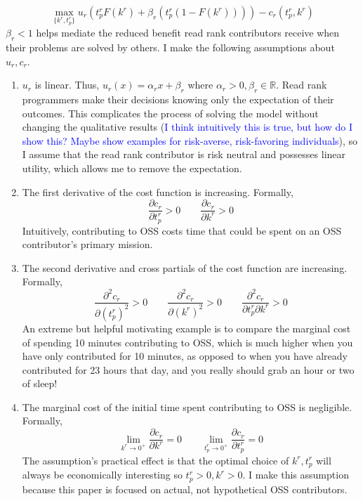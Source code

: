 \documentclass[12pt,notitlepage]{article}
\begin{document}
$$\max_{\{k^r, t_p^r\}} u_r\left(t_p^rF(k^r) + \beta_r(t_p^r (1-F(k^r))) \right) - c_r(t_p^r, k^r)$$
$\beta_r < 1$ helps mediate the reduced benefit read rank contributors receive when their problems are solved by others. 
I make the following assumptions about $u_r, c_r$. 
\begin{enumerate}
    \item $u_r$ is linear. Thus, $u_r(x) = \alpha_r x + \beta_r$ where $\alpha_r > 0, \beta_r \in \mathbb{R}$. Read rank programmers make their decisions knowing only the expectation of their outcomes. This complicates the process of solving the model without changing the qualitative results (\textcolor{blue}{I think intuitively this is true, but how do I show this? Maybe show examples for risk-averse, risk-favoring individuals}), so I assume that the read rank contributor is risk neutral and possesses linear utility, which allows me to remove the expectation. 
    \item The first derivative of the cost function is increasing. Formally, 
    $$\frac{\partial c_r}{\partial t_p^r}>0 \qquad \frac{\partial c_r}{\partial k^r}>0$$
    Intuitively, contributing to OSS costs time that could be spent on an OSS contributor's primary mission. 
    \item The second derivative and cross partials of the cost function are increasing. Formally, $$\frac{\partial^2 c_r}{\partial (t_p^r)^2}>0 \qquad \frac{\partial^2 c_r}{\partial (k^r)^2}>0 \qquad \frac{\partial^2 c_r}{\partial t_p^r \partial k^r}>0$$
    An extreme but helpful motivating example is to compare the marginal cost of spending 10 minutes contributing to OSS, which is much higher when you have only contributed for 10 minutes, as opposed to when you have already contributed for 23 hours that day, and you really should grab an hour or two of sleep! 
    \item The marginal cost of the initial time spent contributing to OSS is negligible. Formally, $$\lim_{k^r \to 0^+} \frac{\partial c_r}{\partial k^r} = 0 \qquad  \lim_{t_p^r \to 0^+} \frac{\partial c_r}{\partial t_p^r} = 0$$
    The assumption's practical effect is that the optimal choice of $k^r, t_p^r$ will always be economically interesting so $t_p^r>0, k^r>0$. I make this assumption because this paper is focused on actual, not hypothetical OSS contributors.
\end{enumerate}
\end{document}
